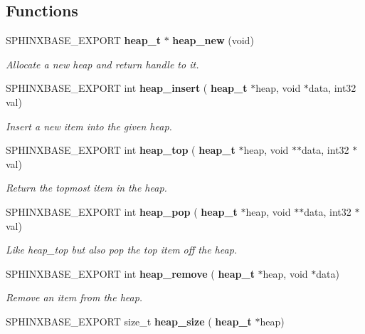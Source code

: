 \subsection*{Functions}
\begin{DoxyCompactItemize}
\item 
\mbox{\label{heap_8h_a9bc21333ce58caaf58e802d8b0190efd}} 
S\+P\+H\+I\+N\+X\+B\+A\+S\+E\+\_\+\+E\+X\+P\+O\+RT \textbf{ heap\+\_\+t} $\ast$ \textbf{ heap\+\_\+new} (void)
\begin{DoxyCompactList}\small\item\em Allocate a new heap and return handle to it. \end{DoxyCompactList}\item 
S\+P\+H\+I\+N\+X\+B\+A\+S\+E\+\_\+\+E\+X\+P\+O\+RT int \textbf{ heap\+\_\+insert} (\textbf{ heap\+\_\+t} $\ast$heap, void $\ast$data, int32 val)
\begin{DoxyCompactList}\small\item\em Insert a new item into the given heap. \end{DoxyCompactList}\item 
S\+P\+H\+I\+N\+X\+B\+A\+S\+E\+\_\+\+E\+X\+P\+O\+RT int \textbf{ heap\+\_\+top} (\textbf{ heap\+\_\+t} $\ast$heap, void $\ast$$\ast$data, int32 $\ast$val)
\begin{DoxyCompactList}\small\item\em Return the topmost item in the heap. \end{DoxyCompactList}\item 
\mbox{\label{heap_8h_a387c8913b4c62ad1a5c4702a4e6dbdbf}} 
S\+P\+H\+I\+N\+X\+B\+A\+S\+E\+\_\+\+E\+X\+P\+O\+RT int \textbf{ heap\+\_\+pop} (\textbf{ heap\+\_\+t} $\ast$heap, void $\ast$$\ast$data, int32 $\ast$val)
\begin{DoxyCompactList}\small\item\em Like heap\+\_\+top but also pop the top item off the heap. \end{DoxyCompactList}\item 
\mbox{\label{heap_8h_aa2dbc059f9707e434098694e8c69157e}} 
S\+P\+H\+I\+N\+X\+B\+A\+S\+E\+\_\+\+E\+X\+P\+O\+RT int \textbf{ heap\+\_\+remove} (\textbf{ heap\+\_\+t} $\ast$heap, void $\ast$data)
\begin{DoxyCompactList}\small\item\em Remove an item from the heap. \end{DoxyCompactList}\item 
\mbox{\label{heap_8h_a1c713d67123e96974505edfa4346cb0f}} 
S\+P\+H\+I\+N\+X\+B\+A\+S\+E\+\_\+\+E\+X\+P\+O\+RT size\+\_\+t \textbf{ heap\+\_\+size} (\textbf{ heap\+\_\+t} $\ast$heap)

\end{DoxyCompactItemize}
